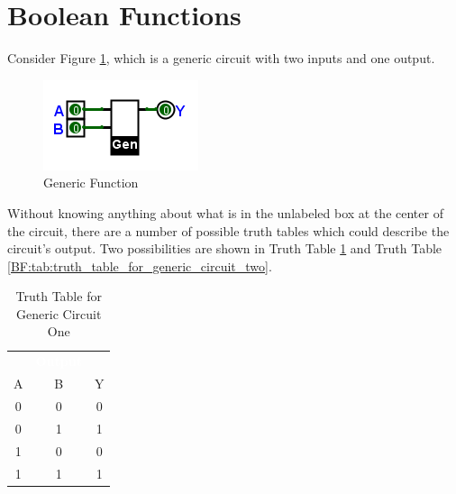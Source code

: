 \section{Boolean Functions}
\label{BF:sec:boolean_functions}

Consider Figure \ref{fig:04_32}, which is a generic circuit with two inputs and one output.

\begin{figure}[H]
	\centering
	\includegraphics[width=\maxwidth{.95\linewidth}]{gfx/04_32}
	\caption{Generic Function}
	\label{fig:04_32}
\end{figure}

Without knowing anything about what is in the unlabeled box at the center of the circuit, there are a number of possible truth tables which could describe the circuit's output. Two possibilities are shown in Truth Table \ref{BF:tab:truth_table_for_generic_circuit_one} and Truth Table \ref{BF:tab:truth_table_for_generic_circuit_two}.

\begin{table}[H]
  \sffamily
  \newcommand{\head}[1]{\textcolor{white}{\textbf{#1}}}    
  \begin{center}
    \begin{tabular}{ccc} 
      \rowcolor{black!75}
      \multicolumn{2}{c}{\head{Inputs}} & \head{Output} \\
      A & B & Y \\
      \hline
      0 & 0 & 0 \\
      0 & 1 & 1 \\
      1 & 0 & 0 \\
      1 & 1 & 1 
    \end{tabular}
  \end{center}
  \caption{Truth Table for Generic Circuit One}
  \label{BF:tab:truth_table_for_generic_circuit_one}
\end{table}

